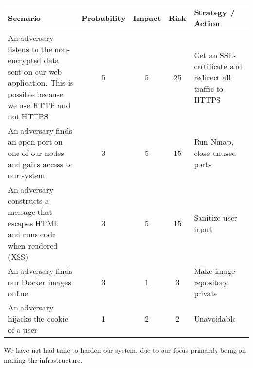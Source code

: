\begin{center}
\begin{tabular}{ |p{3.5cm}|c|c|c|p{2.5cm}| } 
 \hline
 Scenario & Probability & Impact & Risk & Strategy / Action\\ [0.5ex] 
 \hline
 An adversary listens to the non-encrypted data sent on our web application. This is possible because we use HTTP and not HTTPS
 & 5 & 5 & 25 & Get an SSL-certificate and redirect all traffic to HTTPS\\
\hline
 An adversary finds an open port on one of our nodes and gains access to our system & 3 & 5 & 15 & Run Nmap, close unused ports\\
 \hline 
 An adversary constructs a message that escapes HTML and runs code when rendered (XSS) & 3 & 5 & 15 & Sanitize user input\\
 \hline
  An adversary finds our Docker images online & 3 & 1 & 3 & Make image repository private\\ 
 \hline
 An adversary hijacks the cookie of a user & 1 & 2 & 2 & Unavoidable\\ 
 \hline
\end{tabular}
\end{center}


\noindent We have not had time to harden our system, due to our focus primarily being on making the infrastructure. 